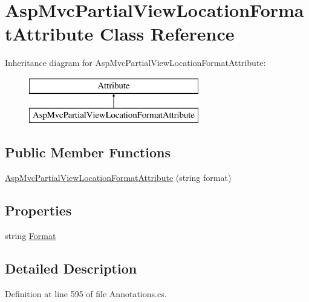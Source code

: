 \hypertarget{class_asp_mvc_partial_view_location_format_attribute}{}\section{Asp\+Mvc\+Partial\+View\+Location\+Format\+Attribute Class Reference}
\label{class_asp_mvc_partial_view_location_format_attribute}
Inheritance diagram for Asp\+Mvc\+Partial\+View\+Location\+Format\+Attribute\+:\begin{figure}[H]
\begin{center}
\leavevmode
\includegraphics[height=2.000000cm]{class_asp_mvc_partial_view_location_format_attribute}
\end{center}
\end{figure}
\subsection*{Public Member Functions}
\begin{DoxyCompactItemize}
\item 
\hyperlink{class_asp_mvc_partial_view_location_format_attribute_a890db06863b6c2b93fbdb6435b512411}{Asp\+Mvc\+Partial\+View\+Location\+Format\+Attribute} (string format)
\end{DoxyCompactItemize}
\subsection*{Properties}
\begin{DoxyCompactItemize}
\item 
string \hyperlink{class_asp_mvc_partial_view_location_format_attribute_ab75cab80e0a441e206eadb7adce25efd}{Format}
\end{DoxyCompactItemize}


\subsection{Detailed Description}


Definition at line 595 of file Annotations.\+cs.



